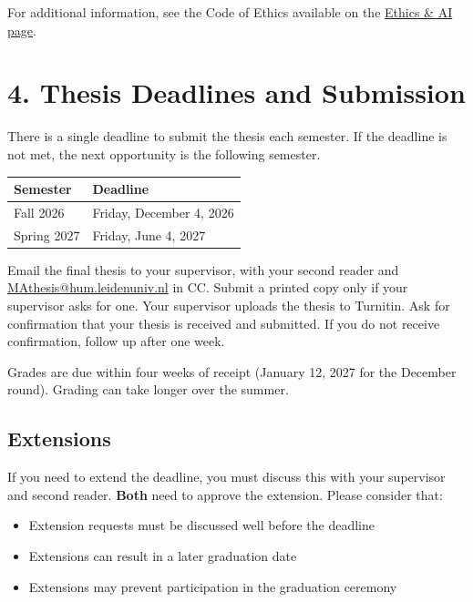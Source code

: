 \documentclass[11pt,a4paper]{article}
\begin{document}
For additional information, see the Code of Ethics available on the \href{https://scdenney.github.io/thesis-supervision/ethics/}{Ethics \& AI page}.

\section{4. Thesis Deadlines and Submission}

There is a single deadline to submit the thesis each semester. If the deadline is not met, the next opportunity is the following semester.

\begin{center}
\begin{tabularx}{\textwidth}{ll}
\toprule
\textbf{Semester} & \textbf{Deadline} \\
\midrule
Fall 2026 & Friday, December 4, 2026 \\
Spring 2027 & Friday, June 4, 2027 \\
\bottomrule
\end{tabularx}
\end{center}

Email the final thesis to your supervisor, with your second reader and \href{mailto:MAthesis@hum.leidenuniv.nl}{MAthesis@hum.leidenuniv.nl} in CC. Submit a printed copy only if your supervisor asks for one. Your supervisor uploads the thesis to Turnitin. Ask for confirmation that your thesis is received and submitted. If you do not receive confirmation, follow up after one week.

Grades are due within four weeks of receipt (January 12, 2027 for the December round). Grading can take longer over the summer.

\subsection{Extensions}

If you need to extend the deadline, you must discuss this with your supervisor and second reader. \textbf{Both} need to approve the extension. Please consider that:

\begin{itemize}
    \item Extension requests must be discussed well before the deadline
    \item Extensions can result in a later graduation date
    \item Extensions may prevent participation in the graduation ceremony
\end{itemize}
\end{document}
